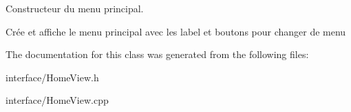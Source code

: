 Constructeur du menu principal. 

Crée et affiche le menu principal avec les label et boutons pour changer de menu 

The documentation for this class was generated from the following files\+:\begin{DoxyCompactItemize}
\item 
interface/Home\+View.\+h\item 
interface/Home\+View.\+cpp\end{DoxyCompactItemize}
